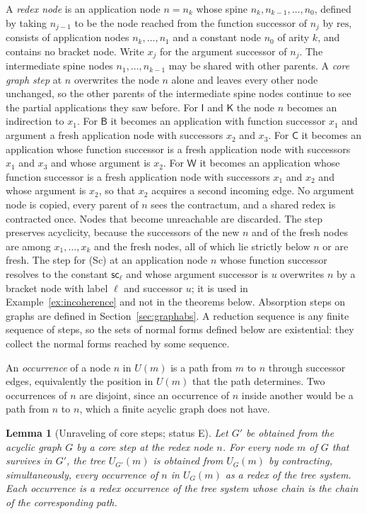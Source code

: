 \documentclass[11pt]{article}
\newtheorem{lemma}[theorem]{Lemma}
\theoremstyle{definition}
\theoremstyle{remark}
\newcommand{\cI}{\mathsf{I}}
\newcommand{\cB}{\mathsf{B}}
\newcommand{\cC}{\mathsf{C}}
\newcommand{\cK}{\mathsf{K}}
\newcommand{\cW}{\mathsf{W}}
\newcommand{\sca}[1]{\mathsf{sc}_{#1}}
\newcommand{\Et}{status E}
\begin{document}
A \emph{redex node} is an application node $n=n_k$ whose spine $n_k,n_{k-1},\dots,n_0$, defined by taking $n_{j-1}$ to be the node reached from the function successor of $n_j$ by $\mathrm{res}$, consists of application nodes $n_k,\dots,n_1$ and a constant node $n_0$ of arity $k$, and contains no bracket node. Write $x_j$ for the argument successor of $n_j$. The intermediate spine nodes $n_1,\dots,n_{k-1}$ may be shared with other parents. A \emph{core graph step} at $n$ overwrites the node $n$ alone and leaves every other node unchanged, so the other parents of the intermediate spine nodes continue to see the partial applications they saw before. For $\cI$ and $\cK$ the node $n$ becomes an indirection to $x_1$. For $\cB$ it becomes an application with function successor $x_1$ and argument a fresh application node with successors $x_2$ and $x_3$. For $\cC$ it becomes an application whose function successor is a fresh application node with successors $x_1$ and $x_3$ and whose argument is $x_2$. For $\cW$ it becomes an application whose function successor is a fresh application node with successors $x_1$ and $x_2$ and whose argument is $x_2$, so that $x_2$ acquires a second incoming edge. No argument node is copied, every parent of $n$ sees the contractum, and a shared redex is contracted once. Nodes that become unreachable are discarded. The step preserves acyclicity, because the successors of the new $n$ and of the fresh nodes are among $x_1,\dots,x_k$ and the fresh nodes, all of which lie strictly below $n$ or are fresh. The step for (Sc) at an application node $n$ whose function successor resolves to the constant $\sca\ell$ and whose argument successor is $u$ overwrites $n$ by a bracket node with label $\ell$ and successor $u$; it is used in Example~\ref{ex:incoherence} and not in the theorems below. Absorption steps on graphs are defined in Section~\ref{sec:graphabs}. A reduction sequence is any finite sequence of steps, so the sets of normal forms defined below are existential: they collect the normal forms reached by some sequence.

An \emph{occurrence} of a node $n$ in $U(m)$ is a path from $m$ to $n$ through successor edges, equivalently the position in $U(m)$ that the path determines. Two occurrences of $n$ are disjoint, since an occurrence of $n$ inside another would be a path from $n$ to $n$, which a finite acyclic graph does not have.

\begin{lemma}[Unraveling of core steps; \Et]\label{lem:unravelcore}
Let $G'$ be obtained from the acyclic graph $G$ by a core step at the redex node $n$. For every node $m$ of $G$ that survives in $G'$, the tree $U_{G'}(m)$ is obtained from $U_G(m)$ by contracting, simultaneously, every occurrence of $n$ in $U_G(m)$ as a redex of the tree system. Each occurrence is a redex occurrence of the tree system whose chain is the chain of the corresponding path.
\end{lemma}
\end{document}
